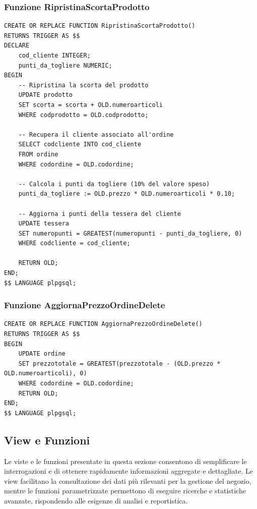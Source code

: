\documentclass[a4paper,12pt]{article}
\begin{document}
\subsubsection*{Funzione RipristinaScortaProdotto}
\vspace{1.5em}
\begin{lstlisting}[style=sqlstyle]
CREATE OR REPLACE FUNCTION RipristinaScortaProdotto()
RETURNS TRIGGER AS $$
DECLARE
    cod_cliente INTEGER;
    punti_da_togliere NUMERIC;
BEGIN
    -- Ripristina la scorta del prodotto
    UPDATE prodotto
    SET scorta = scorta + OLD.numeroarticoli
    WHERE codprodotto = OLD.codprodotto;

    -- Recupera il cliente associato all'ordine
    SELECT codcliente INTO cod_cliente
    FROM ordine
    WHERE codordine = OLD.codordine;

    -- Calcola i punti da togliere (10% del valore speso)
    punti_da_togliere := OLD.prezzo * OLD.numeroarticoli * 0.10;

    -- Aggiorna i punti della tessera del cliente
    UPDATE tessera
    SET numeropunti = GREATEST(numeropunti - punti_da_togliere, 0)
    WHERE codcliente = cod_cliente;

    RETURN OLD;
END;
$$ LANGUAGE plpgsql;
\end{lstlisting}
\vspace{1.5em}

\subsubsection*{Funzione AggiornaPrezzoOrdineDelete}
\vspace{1.5em}
\begin{lstlisting}[style=sqlstyle]
CREATE OR REPLACE FUNCTION AggiornaPrezzoOrdineDelete()
RETURNS TRIGGER AS $$
BEGIN
    UPDATE ordine
    SET prezzototale = GREATEST(prezzototale - (OLD.prezzo * OLD.numeroarticoli), 0)
    WHERE codordine = OLD.codordine;
    RETURN OLD;
END;
$$ LANGUAGE plpgsql;
\end{lstlisting}
\vspace{1.5em}

\subsection{View e Funzioni}
\label{sec:view-funzioni}
\noindent
Le viste e le funzioni presentate in questa sezione consentono di semplificare le interrogazioni e di ottenere rapidamente informazioni aggregate e dettagliate. Le view facilitano la consultazione dei dati più rilevanti per la gestione del negozio, mentre le funzioni parametrizzate permettono di eseguire ricerche e statistiche avanzate, rispondendo alle esigenze di analisi e reportistica.
\end{document}
